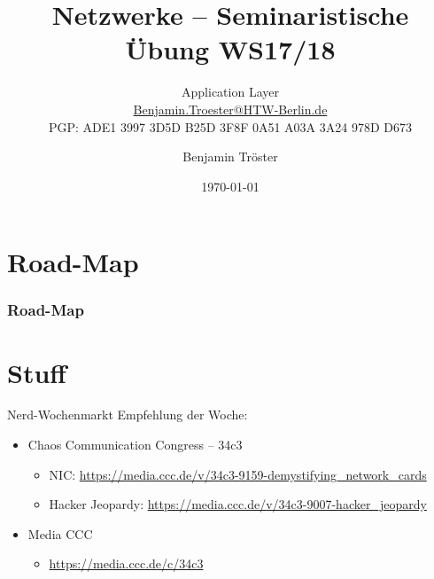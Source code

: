 \documentclass[xcolor=dvipsnames]{beamer}
\begin{document}

\title{Netzwerke -- Seminaristische Übung WS17/18}
\subtitle{Application Layer\\
		\href{mailto:Benjamin.Troester@HTW-Berlin.de}{Benjamin.Troester@HTW-Berlin.de}\\
		PGP: ADE1 3997 3D5D B25D 3F8F 0A51 A03A 3A24 978D D673 }
\author{Benjamin Tröster}

\date{\today}

\begin{frame}
\titlepage
\end{frame}

\section*{Road-Map}
\begin{frame}
\frametitle{Road-Map}
\begin{multicols}{2}
  \tableofcontents
\end{multicols}
\end{frame} 

\section*{Stuff}
\begin{frame}{Nerd-Wochenmarkt}
Empfehlung der Woche:
\begin{itemize}
	\item Chaos Communication Congress -- 34c3
	\begin{itemize}
		\item NIC: \url{https://media.ccc.de/v/34c3-9159-demystifying_network_cards}
		\item Hacker Jeopardy: \url{https://media.ccc.de/v/34c3-9007-hacker_jeopardy}   
	\end{itemize}
	\item Media CCC
	\begin{itemize}
		\item \url{https://media.ccc.de/c/34c3}
	\end{itemize}
\end{itemize}
\end{frame}
\end{document}
